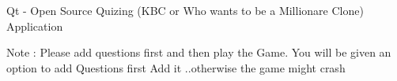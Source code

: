 Qt -\/ Open Source Quizing (KBC or Who wants to be a Millionare Clone) Application

Note \+: Please add questions first and then play the Game. You will be given an option to add Questions first Add it ..otherwise the game might crash 
